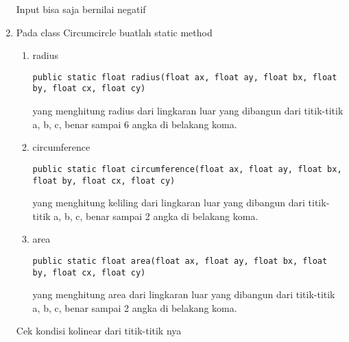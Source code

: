 \documentclass{article}
\begin{document}
\begin{enumerate}
    \begin{hint}
        Input bisa saja bernilai negatif
    \end{hint}

    
    \newpage
    \item Pada class Circumcircle buatlah static method 
    \begin{enumerate}
        \item radius \\
         \begin{lstlisting}[style=standard]
public static float radius(float ax, float ay, float bx, float by, float cx, float cy)
            \end{lstlisting}
             yang menghitung radius dari lingkaran luar yang dibangun dari titik-titik a, b, c, benar sampai 6 angka di belakang koma.

        \item circumference \\
        \begin{lstlisting}[style=standard]
public static float circumference(float ax, float ay, float bx, float by, float cx, float cy)
            \end{lstlisting}
            yang menghitung keliling dari lingkaran luar yang dibangun dari titik-titik a, b, c, benar sampai 2 angka di belakang koma.

        \item area \\
        \begin{lstlisting}[style=standard]
public static float area(float ax, float ay, float bx, float by, float cx, float cy)
            \end{lstlisting}
            yang menghitung area dari lingkaran luar yang dibangun dari titik-titik a, b, c, benar sampai 2 angka di belakang koma.
    \end{enumerate}

    \begin{hint}
        Cek kondisi kolinear dari titik-titik nya
    \end{hint}
\end{enumerate}
\end{document}
